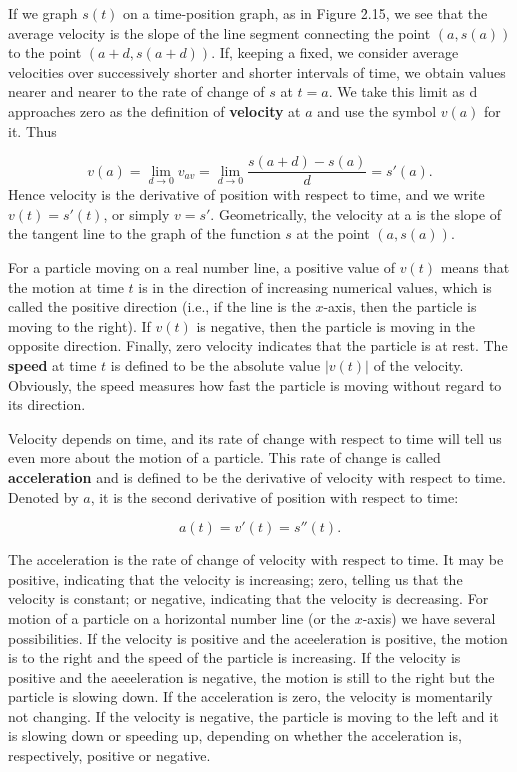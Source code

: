 
\noindent If we graph $s(t)$ on a time-position graph, as in Figure \f{2.15}, we see that the average velocity is the slope of the line segment connecting the point $(a, s(a))$ to the point $(a + d, s(a + d))$. If, keeping a fixed, we consider average velocities over successively shorter and shorter intervals of time, we obtain values nearer and nearer to the rate of change of $s$ at $t = a$. We take this limit as d approaches zero as the definition of \textbf{velocity} at $a$ and use the symbol $v(a)$ for it. Thus

$$
v(a) = \lim_{d \rightarrow 0} v_{av} = \lim_{d \rightarrow 0} \frac{s(a + d) - s(a)}{d} = s'(a). 
$$
\noindent Hence velocity is the derivative of position with respect to time, and we write $v(t) = s'(t)$, or simply $v = s'$. Geometrically, the velocity at a is the slope of the tangent line to the graph of the function $s$ at the point $(a, s(a))$.

For a particle moving on a real number line, a positive value of $v(t)$ means that the motion at time $t$ is in the direction of increasing numerical values, which is called the positive direction (i.e., if the line is the $x$-axis, then the particle is moving to the right). If $v(t)$ is negative, then the particle is moving in the opposite direction. Finally, zero velocity indicates that the particle is at rest. The \textbf{speed} at time $t$ is defined to be the absolute value $|v(t)|$ of the velocity. Obviously, the speed measures how fast the particle is moving without regard to its direction.

Velocity depends on time, and its rate of change with respect to time will tell us even more about the motion of a particle. This rate of change is called \textbf{acceleration} and is defined to be the derivative of velocity with respect to time. Denoted by $a$, it is the second derivative of position with respect to time:

$$
a(t)= v'(t)= s''(t).
$$

The acceleration is the rate of change of velocity with respect to time. It may be positive, indicating that the velocity is increasing; zero, telling us that the velocity is constant; or negative, indicating that the velocity is decreasing. For motion of a particle on a horizontal number line (or the $x$-axis) we have several possibilities. If the velocity is positive and the aceeleration is positive, the motion is to the right and the speed of the particle is increasing. If the velocity is positive and the aeeeleration is negative, the motion is still to the right but the particle is slowing down. If the acceleration is zero, the velocity is momentarily not changing. If the velocity is negative, the particle is moving to the left and it is slowing down or speeding up, depending on whether the acceleration is, respectively, positive or negative.
\medskip

